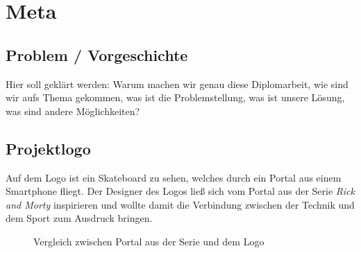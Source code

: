 \chapter{Meta}

\section{Problem / Vorgeschichte}

Hier soll geklärt werden: Warum machen wir genau diese Diplomarbeit, wie sind wir aufs Thema gekommen,
was ist die Problemstellung, was ist unsere Lösung, was sind andere Möglichkeiten?

\section{Projektlogo}
\label{logo}

Auf dem Logo ist ein Skateboard zu sehen, welches durch ein Portal aus einem Smartphone fliegt.
Der Designer des Logos ließ sich vom Portal aus der Serie \textit{Rick and Morty} inspirieren und wollte damit die Verbindung zwischen
der Technik und dem Sport zum Ausdruck bringen.



\begin{figure}[H]
    \centering
    \hfill
    \hfill
    \hfill
    \caption{Vergleich zwischen Portal aus der Serie und dem Logo}
\end{figure}